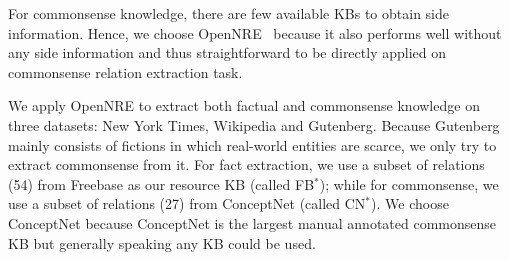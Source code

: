 
For commonsense knowledge, there are few available KBs to obtain side information. 
Hence, we choose OpenNRE~\cite{lin2016neural} because it also performs well without any side information and thus straightforward to be directly applied on commonsense relation extraction task.

We apply OpenNRE to extract both factual and commonsense knowledge
on three datasets: New York Times, Wikipedia and Gutenberg. Because 
Gutenberg mainly consists of fictions in which real-world entities are
scarce, we only try to extract commonsense from it. 
For fact extraction, we use a subset of relations (54) from Freebase as
our resource KB (called FB$^*$); while for commonsense, we use a 
subset of relations (27) from ConceptNet (called CN$^*$). We choose ConceptNet because ConceptNet is the largest manual annotated commonsense KB but generally speaking any KB could be used. 

%
%

